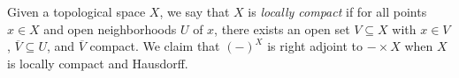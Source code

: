 \documentclass{amsart}
\newcommand{\ol}{\overline}
\theoremstyle{plain}
\newtheorem{lemma}[theorem]{Lemma}
\theoremstyle{definition}
\newcommand{\sseq}{\subseteq}
\newcommand{\0}{\mathbf{0}}
\newcommand{\cF}{\mathcal F}
\renewcommand{\ol}{\overline}
\renewcommand{\(}{\left(}
\renewcommand{\)}{\right)}
\begin{document}
Given a topological space $X$, we say that $X$ is \textit{locally compact} if for all points $x\in X$ and open neighborhoods $U$ of $x$, there exists an open set $V\sseq X$ with $x\in V$, $\ol V\sseq U$, and $\ol V$ compact. We claim that $(-)^X$ is right adjoint to $-\times X$ when $X$ is locally compact and Hausdorff. 

%
\end{document}
